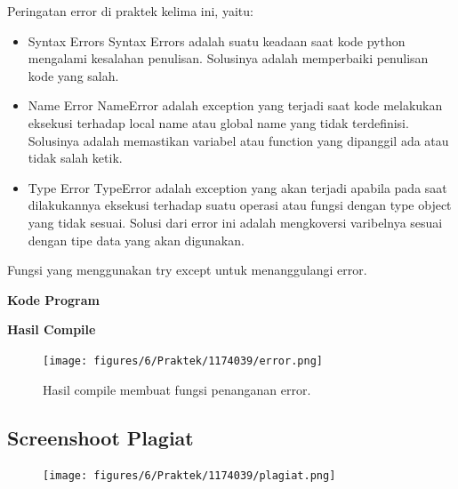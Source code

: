 \hfill \break
Peringatan error di praktek kelima ini, yaitu:
\begin{itemize}
	\item Syntax Errors
	Syntax Errors adalah suatu keadaan saat kode python mengalami kesalahan penulisan. Solusinya adalah memperbaiki penulisan kode yang salah.
	
	\item Name Error
	NameError adalah exception yang terjadi saat kode melakukan eksekusi terhadap local name atau global name yang tidak terdefinisi. Solusinya adalah memastikan variabel atau function yang dipanggil ada atau tidak salah ketik.
	
	\item Type Error
	TypeError adalah exception yang akan terjadi apabila pada saat dilakukannya eksekusi terhadap suatu operasi atau fungsi dengan type object yang tidak sesuai. Solusi dari error ini adalah mengkoversi varibelnya sesuai dengan tipe data yang akan digunakan.
\end{itemize}
\hfill \break
Fungsi yang menggunakan try except untuk menanggulangi error.

\hfill \break
\textbf{Kode Program}



\hfill \break
\textbf{Hasil Compile}

\begin{figure}[H]
	\texttt{[image: figures/6/Praktek/1174039/error.png]}
	\centering
	\caption{Hasil compile membuat fungsi penanganan error.}
\end{figure}

\subsection{Screenshoot Plagiat}
\begin{figure}[H]
	\texttt{[image: figures/6/Praktek/1174039/plagiat.png]}
	\centering
\end{figure}
